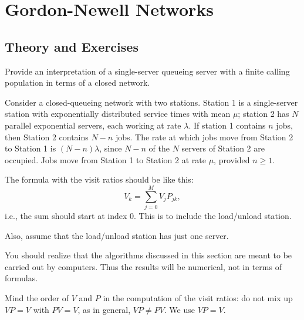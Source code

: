 
\section{Gordon-Newell Networks}
\label{sec:gordonNewell}


\subsection*{Theory and Exercises}



\begin{exercise}
  Provide an interpretation of a single-server queueing server with a
  finite calling population in terms of a closed network.
\begin{solution}
    Consider a closed-queueing network with two stations. Station 1 is
    a single-server station with exponentially distributed service
    times with mean $\mu$; station 2 has $N$ parallel exponential
    servers, each working at rate $\lambda$. If station 1 contains $n$
    jobs, then Station 2 contains $N-n$ jobs.  The rate at which jobs
    move from Station 2 to Station 1 is $(N-n)\lambda$, since $N-n$ of
    the $N$ servers of Station 2 are occupied. Jobs move from Station
    1 to Station 2 at rate $\mu$, provided $n\geq1$.
  \end{solution}
\end{exercise}

The formula with the visit ratios should be like this:
\begin{equation*}
  V_k = \sum_{j=0}^M V_j P_{jk}, 
\end{equation*}
i.e., the sum should start at index 0. This is to include the
load/unload station.

Also, assume that the load/unload station has just one server.


You should realize that the algorithms discussed in this section are
meant to be carried out by computers. Thus the results will be
numerical, not in terms of formulas.

Mind the order of $V$ and $P$ in the computation of the visit ratios:
do not mix up $VP=V$ with $P V=V$, as in general, $VP \neq P V$.  We use
$VP=V$.


